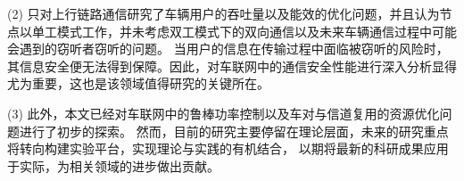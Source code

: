 \begin{conclusion}
(2) 只对上行链路通信研究了车辆用户的吞吐量以及能效的优化问题，并且认为节点以单工模式工作，并未考虑双工模式下的双向通信以及未来车辆通信过程中可能会遇到的窃听者窃听的问题。
当用户的信息在传输过程中面临被窃听的风险时，其信息安全便无法得到保障。因此，对车联网中的通信安全性能进行深入分析显得尤为重要，这也是该领域值得研究的关键所在。

(3) 此外，本文已经对车联网中的鲁棒功率控制以及车对与信道复用的资源优化问题进行了初步的探索。
然而，目前的研究主要停留在理论层面，未来的研究重点将转向构建实验平台，实现理论与实践的有机结合，
以期将最新的科研成果应用于实际，为相关领域的进步做出贡献。
\begin{comment}
结论应是作者在学位论文研究过程中所取得的创新性成果的概要总结，不能与摘要混为一谈。结论应包括论文的主要结果、创新点、展望三部分，在结论中应概括论文的核心观点，明确、客观地指出本研究内容的创新性成果（含新见解、新观点、方法创新、技术创新、理论创新），并指出今后进一步在本研究方向进行研究工作的展望与设想。对所取得的创新性成果应注意从定性和定量两方面给出科学、准确的评价，分(1)、(2)、(3)…条列出，宜用“提出了”、“建立了”等词叙述。此外，结论的撰写还应符合以下基本要求：

(1) 结论具有相对的独立性，不应是对论文中各章小结的简单重复。结论要与引言相呼应，以自身的条理性、明确性、客观性反映论文价值。对论文创新内容的概括，评价要适当。
(2) 结论措辞要准确、严谨，不能模棱两可，避免使用“大概”、“或许”、“可能是”等词语。结论中不应有解释性词语，而应直接给出结果。结论中一般不使用量的符号，而宜用量的名称。

(3) 结论应指出论文研究工作的局限性或遗留问题，如条件所限，或存在例外情况，或本论文尚难以解释或解决的问题。

(4) 常识性的结果或重复他人的结果不应作为结论。

技术难点：
(1)在各复现室外测试场景条件下对设计的分布式可靠传输策略、动态功率优化算法、以及鲁棒博弈策略是否适合于真是的物理环境。
(2)如何将制定的优化问题通过一定数学处理使得问题易于求解是个难点，以及如何得到有效的功率迭代算法是关键的问题。
(3)在进行仿真验证时，相关参数的选取会对结果产生重要影响，如何快速准确的设置相关的参数是仿真中面临的一个关键问题。。
创新点：
(1)考虑了车联网场景中由车辆高速移动所引起的信道不确定性，引入一阶马尔可夫过程。构建了合理可行的车联网络场景，使之在描述车联网动态特性的情况下，又能够通过相应的约束条件和目标函数保证网络通信服务质量。
(2)改进并推广了贝恩斯坦近似方法，将其运用于中断概率的矩阵形式中以处理大规模动态车辆网络环境下非凸的信干噪比约束。
(3)联合考虑了高动态车联网环境下的云边协同计算资源分配与功率优化，使得系统容量最大化的同时以最优卸载策略使车辆中的计算资源得到充分利用。

\end{comment}
\end{conclusion}
